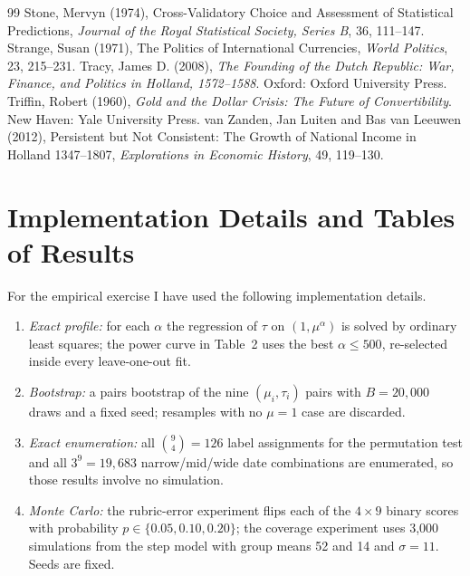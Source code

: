 \documentclass[11pt,letterpaper]{article}
\theoremstyle{definition}
\theoremstyle{plain}
\begin{document}
\begin{thebibliography}{99}
 Stone, Mervyn (1974), Cross-Validatory Choice and Assessment of Statistical Predictions, \emph{Journal of the Royal Statistical Society, Series B}, 36, 111--147.
 Strange, Susan (1971), The Politics of International Currencies, \emph{World Politics}, 23, 215--231.
 Tracy, James D. (2008), \emph{The Founding of the Dutch Republic: War, Finance, and Politics in Holland, 1572--1588}. Oxford: Oxford University Press.
 Triffin, Robert (1960), \emph{Gold and the Dollar Crisis: The Future of Convertibility}. New Haven: Yale University Press.
 van Zanden, Jan Luiten and Bas van Leeuwen (2012), Persistent but Not Consistent: The Growth of National Income in Holland 1347--1807, \emph{Explorations in Economic History}, 49, 119--130.
\end{thebibliography}

\appendix
\section{Implementation Details and Tables of Results}\label{app:impl}
For the empirical exercise I have used the following implementation details.
\begin{enumerate}[label=(\alph*),leftmargin=2em,itemsep=2pt]
\item \emph{Exact profile:} for each $\alpha$ the regression of $\tau$ on $(1,\mu^{\alpha})$ is solved by ordinary least squares; the power curve in Table~2 uses the best $\alpha\le500$, re-selected inside every leave-one-out fit.
\item \emph{Bootstrap:} a pairs bootstrap of the nine $(\mu_i,\tau_i)$ pairs with $B=20{,}000$ draws and a fixed seed; resamples with no $\mu=1$ case are discarded.
\item \emph{Exact enumeration:} all $\binom94=126$ label assignments for the permutation test and all $3^9=19{,}683$ narrow/mid/wide date combinations are enumerated, so those results involve no simulation.
\item \emph{Monte Carlo:} the rubric-error experiment flips each of the $4\times9$ binary scores with probability $p\in\{0.05,0.10,0.20\}$; the coverage experiment uses 3,000 simulations from the step model with group means 52 and 14 and $\sigma=11$. Seeds are fixed.
\end{enumerate}
\end{document}
